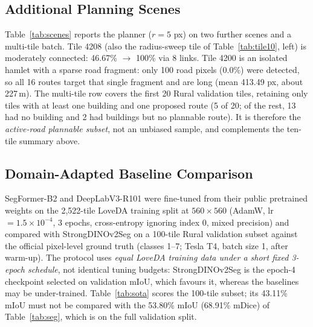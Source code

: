 \subsection{Additional Planning Scenes}\label{sec:scenes}
Table~\ref{tab:scenes} reports the planner ($r=5$ px) on two further scenes and a multi-tile batch. Tile 4208 (also the radius-sweep tile of Table~\ref{tab:tile10}, left) is moderately connected: 46.67\% $\to$ 100\% via 8 links. Tile 4200 is an isolated hamlet with a sparse road fragment: only 100 road pixels (0.0\%) were detected, so all 16 routes target that single fragment and are long (mean 413.49 px, about 227\,m). The multi-tile row covers the first 20 Rural validation tiles, retaining only tiles with at least one building and one proposed route (5 of 20; of the rest, 13 had no building and 2 had buildings but no plannable route). It is therefore the \emph{active-road plannable subset}, not an unbiased sample, and complements the ten-tile summary above.

\begin{table}[t]
\caption{Additional planning scenes ($r=5$ px). The multi-tile row is the active-road plannable subset (5 of the first 20 Rural validation tiles), per-tile means.}\label{tab:scenes}
\centering
{}
\end{table}

\subsection{Domain-Adapted Baseline Comparison}\label{sec:sota}
SegFormer-B2 and DeepLabV3-R101 were fine-tuned from their public pretrained weights on the 2,522-tile LoveDA training split at $560\times560$ (AdamW, lr $=1.5\times10^{-4}$, 3 epochs, cross-entropy ignoring index 0, mixed precision) and compared with StrongDINOv2Seg on a 100-tile Rural validation subset against the official pixel-level ground truth (classes 1--7; Tesla T4, batch size 1, after warm-up). The protocol uses \emph{equal LoveDA training data under a short fixed 3-epoch schedule}, not identical tuning budgets: StrongDINOv2Seg is the epoch-4 checkpoint selected on validation mIoU, which favours it, whereas the baselines may be under-trained. Table~\ref{tab:sota} scores the 100-tile subset; its 43.11\% mIoU must not be compared with the 53.80\% mIoU (68.91\% mDice) of Table~\ref{tab:seg}, which is on the full validation split.

